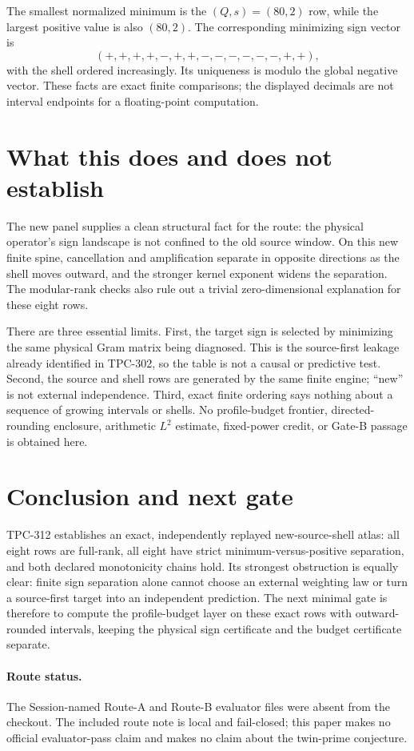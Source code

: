 \documentclass[10pt,a4paper]{article}
\begin{document}
The smallest normalized minimum is the $(Q,s)=(80,2)$ row, while the largest
positive value is also $(80,2)$.  The corresponding minimizing sign vector is
\[
 (+,+,+,+,-,+,+,-,-,-,-,-,-,+,+),
\]
with the shell ordered increasingly.  Its uniqueness is modulo the global
negative vector.  These facts are exact finite comparisons; the displayed
decimals are not interval endpoints for a floating-point computation.

\section{What this does and does not establish}

The new panel supplies a clean structural fact for the route: the physical
operator's sign landscape is not confined to the old source window.  On this
new finite spine, cancellation and amplification separate in opposite
directions as the shell moves outward, and the stronger kernel exponent
widens the separation.  The modular-rank checks also rule out a trivial
zero-dimensional explanation for these eight rows.

There are three essential limits.  First, the target sign is selected by
minimizing the same physical Gram matrix being diagnosed.  This is the
source-first leakage already identified in TPC-302, so the table is not a
causal or predictive test.  Second, the source and shell rows are generated by
the same finite engine; ``new'' is not external independence.  Third, exact
finite ordering says nothing about a sequence of growing intervals or shells.
No profile-budget frontier, directed-rounding enclosure, arithmetic $L^2$
estimate, fixed-power credit, or Gate-B passage is obtained here.

\section{Conclusion and next gate}

TPC-312 establishes an exact, independently replayed new-source-shell atlas:
all eight rows are full-rank, all eight have strict minimum-versus-positive
separation, and both declared monotonicity chains hold.  Its strongest
obstruction is equally clear: finite sign separation alone cannot choose an
external weighting law or turn a source-first target into an independent
prediction.  The next minimal gate is therefore to compute the profile-budget
layer on these exact rows with outward-rounded intervals, keeping the physical
sign certificate and the budget certificate separate.

\paragraph{Route status.}
The Session-named Route-A and Route-B evaluator files were absent from the
checkout.  The included route note is local and fail-closed; this paper makes
no official evaluator-pass claim and makes no claim about the twin-prime
conjecture.


\begingroup\small

\endgroup
\end{document}
